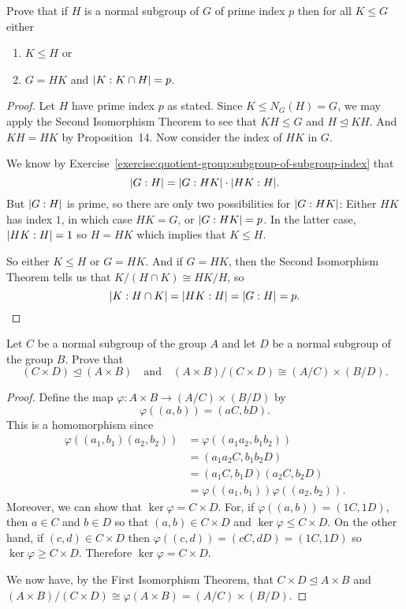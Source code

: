 \label{exercise:quotient-group:subgrp-prime-index-consequences}
Prove that if $H$ is a normal subgroup of $G$ of prime index $p$ then
for all $K\leq G$ either
\begin{enumerate}
\item $K\leq H$ or
\item $G = HK$ and $\lvert{K:K\cap H}\rvert = p$.
\end{enumerate}
\begin{proof}
  Let $H$ have prime index $p$ as stated. Since $K\leq N_G(H) = G$, we
  may apply the Second Isomorphism Theorem to see that $KH\leq G$ and
  $H\trianglelefteq KH$. And $KH = HK$ by Proposition~14. Now consider
  the index of $HK$ in $G$.

  We know by
  Exercise~\ref{exercise:quotient-group:subgroup-of-subgroup-index}
  that
  \begin{equation*}
    \lvert{G:H}\rvert = \lvert{G:HK}\rvert\cdot\lvert{HK:H}\rvert.
  \end{equation*}
  But $\lvert{G:H}\rvert$ is prime, so there are only two possibilities for
  $\lvert{G:HK}\rvert$: Either $HK$ has index $1$, in which case $HK = G$, or
  $\lvert{G:HK}\rvert = p$. In the latter case, $\lvert{HK:H}\rvert = 1$ so $H = HK$
  which implies that $K\leq H$.

  So either $K\leq H$ or $G = HK$. And if $G = HK$, then the Second
  Isomorphism Theorem tells us that $K/(H\cap K)\cong HK/H$, so
  \begin{equation*}
    \lvert{K:H\cap K}\rvert = \lvert{HK:H}\rvert = \lvert{G:H}\rvert = p. \qedhere
  \end{equation*}
\end{proof}

 Let $C$ be a normal subgroup of the group $A$ and let $D$
be a normal subgroup of the group $B$. Prove that
\begin{equation*}
  (C\times D)\trianglelefteq(A\times B)
  \quad\text{and}\quad
  (A\times B)/(C\times D)\cong(A/C)\times(B/D).
\end{equation*}
\begin{proof}
  Define the map $\varphi\colon A\times B\to(A/C)\times(B/D)$ by
  \begin{equation*}
    \varphi((a,b)) = (aC,bD).
  \end{equation*}
  This is a homomorphism since
  \begin{align*}
    \varphi((a_1,b_1)(a_2,b_2))
    &= \varphi((a_1a_2,b_1b_2)) \\
    &= (a_1a_2C, b_1b_2D) \\
    &= (a_1C,b_1D)(a_2C,b_2D) \\
    &= \varphi((a_1,b_1))\varphi((a_2,b_2)).
  \end{align*}
  Moreover, we can show that $\ker\varphi = C\times D$. For, if
  $\varphi((a,b)) = (1C,1D)$, then $a\in C$ and $b\in D$ so that
  $(a,b)\in C\times D$ and $\ker\varphi\leq C\times D$. On the other
  hand, if $(c,d)\in C\times D$ then
  $\varphi((c,d)) = (cC, dD) = (1C,1D)$ so
  $\ker\varphi\geq C\times D$. Therefore $\ker\varphi = C\times D$.

  We now have, by the First Isomorphism Theorem, that
  $C\times D\trianglelefteq A\times B$ and
  $(A\times B)/(C\times D)\cong \varphi(A\times B) =
  (A/C)\times(B/D)$.
\end{proof}

